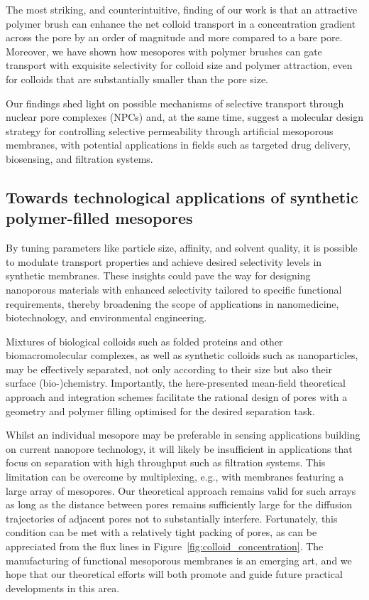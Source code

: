 \documentclass[12pt, a4paper]{article}
\begin{document}
The most striking, and counterintuitive, finding of our work is that an attractive polymer brush can enhance the net colloid transport in a concentration gradient across the pore by an order of magnitude and more compared to a bare pore.
Moreover, we have shown how mesopores with polymer brushes can gate transport with exquisite selectivity for colloid size and polymer attraction, even for colloids that are substantially smaller than the pore size.

Our findings shed light on possible mechanisms of selective transport through nuclear pore complexes (NPCs) and, at the same time, suggest a molecular design strategy for controlling selective permeability through artificial mesoporous membranes, with potential applications in fields such as targeted drug delivery, biosensing, and filtration systems.

\subsection{Towards technological applications of synthetic polymer-filled mesopores}

By tuning parameters like particle size, affinity, and solvent quality, it is possible to modulate transport properties and achieve desired selectivity levels in synthetic membranes.
These insights could pave the way for designing nanoporous materials with enhanced selectivity tailored to specific functional requirements, thereby broadening the scope of applications in nanomedicine, biotechnology, and environmental engineering.

Mixtures of biological colloids such as folded proteins and other biomacromolecular complexes, as well as synthetic colloids such as nanoparticles, may be effectively separated, not only according to their size but also their surface (bio-)chemistry.
Importantly, the here-presented mean-field theoretical approach and integration schemes facilitate the rational design of pores with a geometry and polymer filling optimised for the desired separation task.

Whilst an individual mesopore may be preferable in sensing applications building on current nanopore technology, it will likely be insufficient in applications that focus on separation with high throughput such as filtration systems.
This limitation can be overcome by multiplexing, e.g., with membranes featuring a large array of mesopores.
Our theoretical approach remains valid for such arrays as long as the distance between pores remains sufficiently large for the diffusion trajectories of adjacent pores not to substantially interfere.
Fortunately, this condition can be met with a relatively tight packing of pores, as can be appreciated from the flux lines in  Figure~\ref{fig:colloid_concentration}.
The manufacturing of functional mesoporous membranes is an emerging art, and we hope that our theoretical efforts will both promote and guide future practical developments in this area. 
\end{document}
